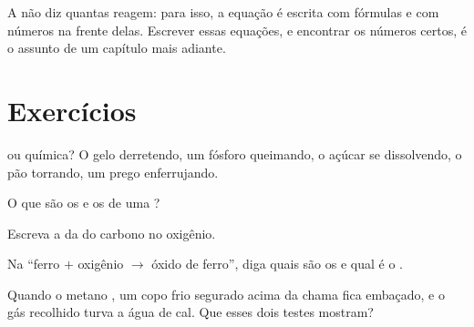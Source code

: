 \begin{remark}\label{rem:g7:chemical-reactions:counting}
A  não diz quantas  reagem: para isso, a
equação é escrita com fórmulas e com números na frente delas. Escrever
essas equações, e encontrar os números certos, é o assunto de um
capítulo mais adiante.
\end{remark}

\section{Exercícios}

\begin{exercise}[$\star$]\label{exo:g7:chemical-reactions:1}
 ou química? O gelo derretendo, um fósforo
queimando, o açúcar se dissolvendo, o pão torrando, um prego
enferrujando.
\end{exercise}

\begin{exercise}[$\star$]\label{exo:g7:chemical-reactions:2}
O que são os  e os  de uma ?
\end{exercise}

\begin{exercise}[$\star$]\label{exo:g7:chemical-reactions:3}
Escreva a  da  do carbono no oxigênio.
\end{exercise}

\begin{exercise}[$\star$]\label{exo:g7:chemical-reactions:4}
Na  ``ferro $+$ oxigênio $\longrightarrow$ óxido de
ferro'', diga quais são os  e qual é o .
\end{exercise}

\begin{exercise}[$\star\star$]\label{exo:g7:chemical-reactions:5}
Quando o metano , um copo frio segurado acima da chama fica
embaçado, e o gás recolhido turva a água de cal. Que  esses dois
testes mostram?
\end{exercise}


